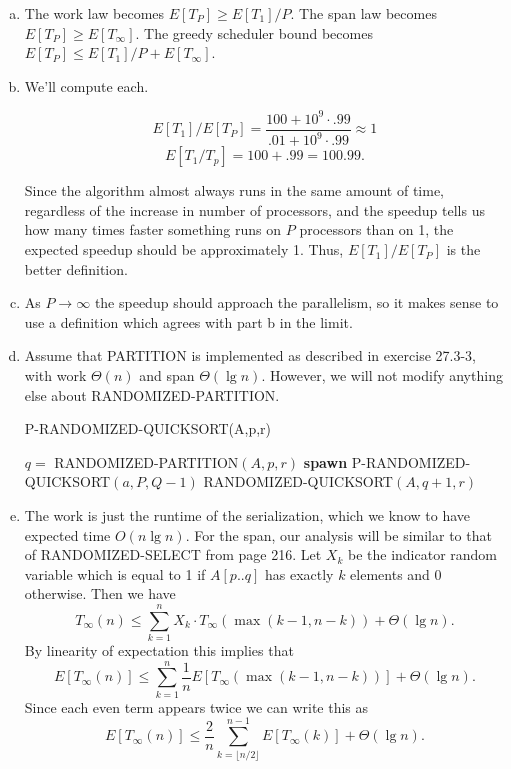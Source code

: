 \documentclass{article}
\begin{document}
\begin{enumerate}[a.]
\item The work law becomes $E[T_P] \geq E[T_1]/P$.  The span law becomes $E[T_P] \geq E[T_\infty]$. The greedy scheduler bound becomes $E[T_P] \leq E[T_1]/P + E[T_\infty]$. 

\item We'll compute each.  

\[ E[T_1] / E[T_P] = \frac{100 + 10^9\cdot.99}{.01 + 10^9\cdot .99} \approx 1\]
\[ E[T_1/T_p] = 100 + .99 = 100.99.\]

Since the algorithm almost always runs in the same amount of time, regardless of the increase in number of processors, and the speedup tells us how many times faster something runs on $P$ processors than on 1, the expected speedup should be approximately 1.  Thus, $E[T_1]/E[T_P]$ is the better definition. 

\item As $P \to \infty$ the speedup should approach the parallelism, so it makes sense to use a definition which agrees with part b in the limit. 

\item Assume that PARTITION is implemented as described in exercise 27.3-3, with work $\Theta(n)$ and span $\Theta(\lg n)$. However, we will not modify anything else about RANDOMIZED-PARTITION. 

\begin{algorithm}
\caption{P-RANDOMIZED-QUICKSORT(A,p,r)}
\begin{algorithmic}[1]
	\State $q = $ RANDOMIZED-PARTITION$(A,p,r)$
	\State \textbf{spawn} P-RANDOMIZED-QUICKSORT$(a,P,Q-1)$
	\State RANDOMIZED-QUICKSORT$(A,q+1,r)$
\EndIf
\end{algorithmic}
\end{algorithm}

\item The work is just the runtime of the serialization, which we know to have expected time $O(n \lg n)$.  For the span, our analysis will be similar to that of RANDOMIZED-SELECT from page 216.  Let $X_k$ be the indicator random variable which is equal to 1 if $A[p..q]$ has exactly $k$ elements and 0 otherwise. Then we have
\[ T_\infty(n) \leq \sum_{k=1}^n X_k \cdot T_\infty(\max(k-1, n-k)) + \Theta(\lg n).\]
By linearity of expectation this implies that
\[E[T_\infty(n)] \leq \sum_{k=1}^n \frac{1}{n}E[T_\infty(\max(k-1, n-k))] + \Theta(\lg n).\]
Since each even term appears twice we can write this as
\[ E[T_\infty(n)] \leq \frac{2}{n}\sum_{k=\lfloor n/2 \rfloor}^{n-1} E[T_\infty(k)] + \Theta(\lg n).\]

\end{enumerate}
\end{document}
